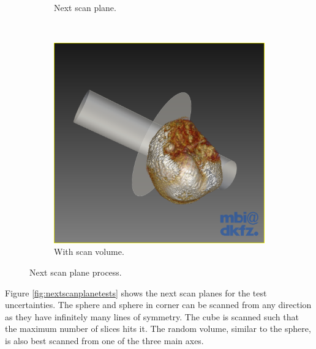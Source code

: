 \begin{figure}[H]
\begin{subfigure}[b]{0.32\textwidth}
    \caption*{Next scan plane.}
    \label{fig:nextscanplane1}
  \end{subfigure}%
  ~ %
  \begin{subfigure}[b]{0.32\textwidth}
    \includegraphics[width=\textwidth]{images/next_scan_plane/next_scan_plane_2.png}
    \caption*{With scan volume.}
    \label{fig:nextscanplane2}  
  \end{subfigure}
  \caption{Next scan plane process.}\label{fig:nextscanplane}
\end{figure}

Figure \ref{fig:nextscanplanetests} shows the next scan planes for the test uncertainties. The sphere and sphere in corner can be scanned from any direction as they have infinitely many lines of symmetry. The cube is scanned such that the maximum number of slices hits it. The random volume, similar to the sphere, is also best scanned from one of the three main axes.

